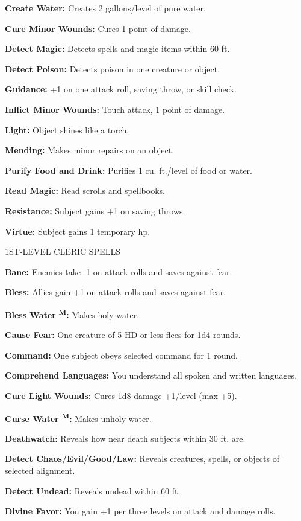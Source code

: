 \documentclass{article}
\begin{document}
\textbf{Create Water:} Creates 2 gallons/level of pure water.

\textbf{Cure Minor Wounds:} Cures 1 point of damage.

\textbf{Detect Magic:} Detects spells and magic items within 60 ft.

\textbf{Detect Poison:} Detects poison in one creature or object.

\textbf{Guidance:} +1 on one attack roll, saving throw, or skill check.

\textbf{Inflict Minor Wounds:} Touch attack, 1 point of damage.

\textbf{Light:} Object shines like a torch.

\textbf{Mending: }Makes minor repairs on an object.

\textbf{Purify Food and Drink:} Purifies 1 cu. ft./level of food or water.

\textbf{Read Magic:} Read scrolls and spellbooks.

\textbf{Resistance:} Subject gains +1 on saving throws.

\textbf{Virtue:} Subject gains 1 temporary hp.

1ST-LEVEL CLERIC SPELLS

\textbf{Bane:} Enemies take -1 on attack rolls and saves against fear.

\textbf{Bless:} Allies gain +1 on attack rolls and saves against fear.

\textbf{Bless Water }\textsuperscript{\textbf{M}}\textbf{: }Makes holy water.

\textbf{Cause Fear:} One creature of 5 HD or less flees for 1d4 rounds.

\textbf{Command:} One subject obeys selected command for 1 round.

\textbf{Comprehend Languages:} You understand all spoken and written languages.

\textbf{Cure Light Wounds:} Cures 1d8 damage +1/level (max +5).

\textbf{Curse Water }\textsuperscript{\textbf{M}}\textbf{: }Makes unholy water.

\textbf{Deathwatch:} Reveals how near death subjects within 30 ft. are.

\textbf{Detect Chaos/Evil/Good/Law:} Reveals creatures, spells, or objects of selected 
alignment.

\textbf{Detect Undead:} Reveals undead within 60 ft.

\textbf{Divine Favor:} You gain +1 per three levels on attack and damage rolls.
\end{document}
